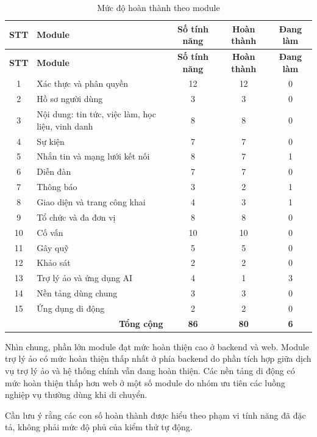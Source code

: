 \documentclass[12pt,a4paper,oneside]{report}
\begin{document}
\renewcommand{\arraystretch}{1.2}
\begin{longtable}{|c|>{\raggedright\arraybackslash}p{6.6cm}|c|c|c|}
\caption{Mức độ hoàn thành theo module}\label{tab:completion}\\
\hline \textbf{STT} & \textbf{Module} & \textbf{Số tính năng} & \textbf{Hoàn thành} & \textbf{Đang làm} \\ \hline
\endfirsthead
\hline \textbf{STT} & \textbf{Module} & \textbf{Số tính năng} & \textbf{Hoàn thành} & \textbf{Đang làm} \\ \hline
\endhead
1 & Xác thực và phân quyền & 12 & 12 & 0 \\ \hline
2 & Hồ sơ người dùng & 3 & 3 & 0 \\ \hline
3 & Nội dung: tin tức, việc làm, học liệu, vinh danh & 8 & 8 & 0 \\ \hline
4 & Sự kiện & 7 & 7 & 0 \\ \hline
5 & Nhắn tin và mạng lưới kết nối & 8 & 7 & 1 \\ \hline
6 & Diễn đàn & 7 & 7 & 0 \\ \hline
7 & Thông báo & 3 & 2 & 1 \\ \hline
8 & Giao diện và trang công khai & 4 & 3 & 1 \\ \hline
9 & Tổ chức và đa đơn vị & 8 & 8 & 0 \\ \hline
10 & Cố vấn & 10 & 10 & 0 \\ \hline
11 & Gây quỹ & 5 & 5 & 0 \\ \hline
12 & Khảo sát & 2 & 2 & 0 \\ \hline
13 & Trợ lý ảo và ứng dụng AI & 4 & 1 & 3 \\ \hline
14 & Nền tảng dùng chung & 3 & 3 & 0 \\ \hline
15 & Ứng dụng di động & 2 & 2 & 0 \\ \hline
\multicolumn{2}{|r|}{\textbf{Tổng cộng}} & \textbf{86} & \textbf{80} & \textbf{6} \\ \hline
\end{longtable}
\renewcommand{\arraystretch}{1}

Nhìn chung, phần lớn module đạt mức hoàn thiện cao ở backend và web. Module trợ lý ảo có mức hoàn thiện thấp nhất ở phía backend do phần tích hợp giữa dịch vụ trợ lý ảo và hệ thống chính vẫn đang hoàn thiện. Các nền tảng di động có mức hoàn thiện thấp hơn web ở một số module do nhóm ưu tiên các luồng nghiệp vụ thường dùng khi di chuyển.

Cần lưu ý rằng các con số hoàn thành được hiểu theo phạm vi tính năng đã đặc tả, không phải mức độ phủ của kiểm thử tự động.
\end{document}
